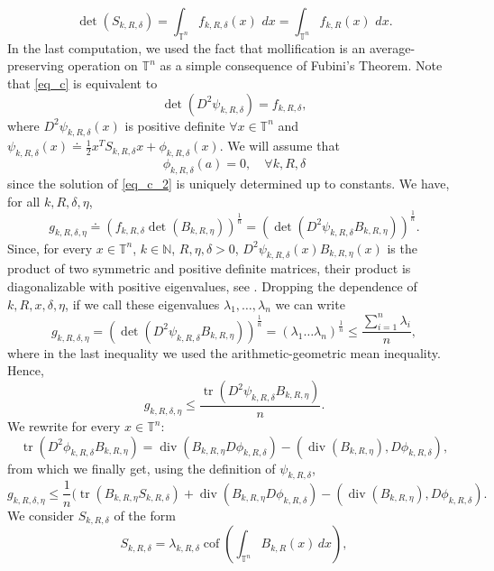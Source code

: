 \documentclass[10pt,reqno]{amsart}
\numberwithin{equation}{section}
\newcommand{\T}{\mathbb{T}}
\newcommand{\N}{\mathbb{N}}
\DeclareMathOperator{\cof}{cof}
\DeclareMathOperator{\dv}{div}
\DeclareMathOperator{\tr}{tr}
\theoremstyle{plain}
\theoremstyle{definition}
\theoremstyle{remark}
\begin{document}
\begin{equation}\label{con}
\det(S_{k,R,\delta}) = \int_{\T^n}f_{k,R,\delta}(x)\, \,dx = \int_{\T^n}f_{k,R}(x)\, \,dx.
\end{equation}
In the last computation, we used the fact that mollification is an average-preserving operation on $\T^n$ as a simple consequence of Fubini's Theorem. Note that \eqref{eq_c} is equivalent to 
\begin{equation}\label{eq_c_2}
\det(D^2\psi_{k,R,\delta} ) =  f_{k,R,\delta},
\end{equation}
where $D^2\psi_{k,R,\delta}(x)$ is positive definite $\forall x \in \T^n$ and $\psi_{k,R,\delta}(x)\doteq \frac{1}{2}x^T S_{k,R,\delta} x +\phi_{k,R,\delta}(x)$. We will assume that
\begin{equation}\label{zer}
\phi_{k,R,\delta}(a) = 0,\quad  \forall k,R, \delta
\end{equation}
since the solution of \eqref{eq_c_2} is uniquely determined up to constants. We have, for all $k,R,\delta, \eta$,
$$
g_{k,R,\delta,\eta}\doteq \left(f_{k,R,\delta}\det(B_{k,R,\eta})\right)^\frac{1}{n}=\left( \det(D^2\psi_{k,R,\delta} B_{k,R,\eta} ) \right)^\frac{1}{n}.
$$
Since, for every $x \in \T^n$, $k \in \N$, $R,\eta,\delta > 0$, $D^2\psi_{k,R,\delta}(x)B_{k,R,\eta}(x)$ is the product of two symmetric and positive definite matrices, their product is diagonalizable with positive eigenvalues, see \cite[Prop. 6.1]{SERBOOK}. Dropping the dependence of $k,R,x,\delta,\eta$, if we call these eigenvalues $\lambda_1,\dots, \lambda_n$ we can write
\[
g_{k,R,\delta,\eta} = \left( \det(D^2\psi_{k,R,\delta} B_{k,R,\eta} ) \right)^\frac{1}{n} = (\lambda_1\dots\lambda_n)^{\frac{1}{n}} \le \frac{\sum_{i = 1}^n\lambda_i}{n},
\]
where in the last inequality we used the arithmetic-geometric mean inequality. Hence,
\[
g_{k,R,\delta,\eta} \le \frac{\tr(D^2\psi_{k,R,\delta} B_{k,R,\eta})}{n}.
\]
We rewrite for every $x \in \T^n$:
\[
\tr(D^2\phi_{k,R,\delta}B_{k,R,\eta})  = \dv(B_{k,R,\eta}D \phi_{k,R,\delta}) - (\dv(B_{k,R,\eta}),D\phi_{k,R,\delta}),
\]
from which we finally get, using the definition of $\psi_{k,R,\delta}$,
\begin{equation}\label{tbin}
g_{k,R,\delta,\eta}\le\frac{1}{n} (\tr(B_{k,R,\eta} S_{k,R,\delta} )+\dv(B_{k,R,\eta}D \phi_{k,R,\delta}) - (\dv(B_{k,R,\eta}),D\phi_{k,R,\delta}).
\end{equation}
We consider $S_{k,R,\delta}$ of the form
\begin{equation}\label{SkR}
S_{k,R,\delta} = \lambda_{k,R,\delta}\cof\left(\int_{\T^n}B_{k,R}(x)\,dx\right),
\end{equation}
\end{document}
